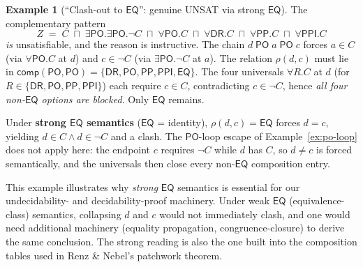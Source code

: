 \documentclass[
]{ceurart}
\theoremstyle{definition}
\newtheorem{examplex}[theorem]{Example}
\newcommand{\DR}{\ensuremath{\mathsf{DR}}}
\newcommand{\PO}{\ensuremath{\mathsf{PO}}}
\newcommand{\EQ}{\ensuremath{\mathsf{EQ}}}
\newcommand{\PP}{\ensuremath{\mathsf{PP}}}
\newcommand{\PPI}{\ensuremath{\mathsf{PPI}}}
\newcommand{\comp}{\ensuremath{\mathsf{comp}}}
\begin{document}
\begin{examplex}[``Clash-out to $\EQ$'': genuine UNSAT via strong $\EQ$]
\label{ex:clash-to-eq}
The complementary pattern
\[
  Z \;=\; C
    \;\sqcap\; \exists\PO.\exists\PO.\neg C
    \;\sqcap\; \forall\PO.C
    \;\sqcap\; \forall\DR.C
    \;\sqcap\; \forall\PP.C
    \;\sqcap\; \forall\PPI.C
\]
\emph{is} unsatisfiable, and the reason is instructive. The chain
$d \;\PO\; a \;\PO\; c$ forces $a \in C$ (via $\forall\PO.C$ at $d$)
and $c \in \neg C$ (via $\exists\PO.\neg C$ at $a$). The
relation $\rho(d,c)$ must lie in
$\comp(\PO,\PO) = \{\DR,\PO,\PP,\PPI,\EQ\}$. The four universals
$\forall R.C$ at $d$ (for $R \in \{\DR,\PO,\PP,\PPI\}$) each
require $c \in C$, contradicting $c \in \neg C$, hence
\emph{all four non-$\EQ$ options are blocked}. Only $\EQ$ remains.

Under \textbf{strong $\EQ$ semantics} ($\EQ$ = identity),
$\rho(d,c) = \EQ$ forces $d = c$, yielding $d \in C \land d \in \neg C$
and a clash. The $\PO$-loop escape of
Example~\ref{ex:po-loop} does not apply here: the endpoint $c$
requires $\neg C$ while $d$ has $C$, so $d \ne c$ is forced
semantically, and the universals then close every non-$\EQ$
composition entry.

This example illustrates why \emph{strong} $\EQ$ semantics is
essential for our undecidability- and decidability-proof
machinery. Under weak $\EQ$ (equivalence-class) semantics,
collapsing $d$ and $c$ would not immediately clash, and one would
need additional machinery (equality propagation,
congruence-closure) to derive the same conclusion. The strong
reading is also the one built into the composition tables used
in Renz \& Nebel's patchwork theorem.
\end{examplex}
\end{document}
